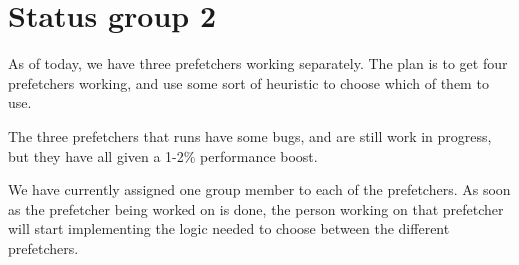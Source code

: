 \documentclass[a4paper,10pt,titlepage]{article}
\begin{document}
\section{Status group 2}
As of today, we have three prefetchers working separately. The plan is
to get four prefetchers working, and use some sort of heuristic to
choose which of them to use.

The three prefetchers that runs have some bugs, and are still work in
progress, but they have all given a 1-2\% performance boost.

We have currently assigned one group member to each of the
prefetchers. As soon as the prefetcher being worked on is done, the
person working on that prefetcher will start implementing the
logic needed to choose between the different prefetchers.
\end{document}
